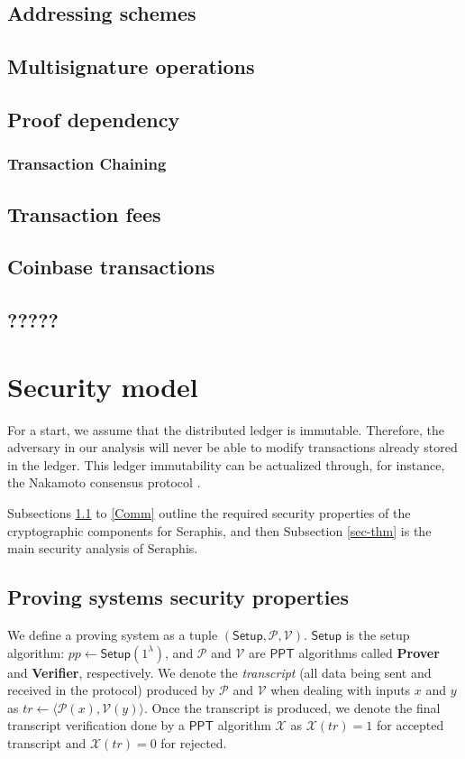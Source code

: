 \documentclass{article}
\theoremstyle{plain}
\theoremstyle{remark}
\begin{document}
\subsection{Addressing schemes}\label{addr-scheme}
\subsection{Multisignature operations}
\subsection{Proof dependency}\label{proof-dep}
\subsubsection*{Transaction Chaining}
\subsection{Transaction fees}
\subsection{Coinbase transactions}
\subsection{?????}

\section{Security model}\label{sec}
For a start, we assume that the distributed ledger is immutable. Therefore, the adversary in our analysis will never be able to modify transactions already stored in the ledger. This ledger immutability can be actualized through, for instance, the Nakamoto consensus protocol \cite{bitcoin}.

Subsections \ref{prov-prop} to \ref{Comm} outline the required security properties of the cryptographic components for Seraphis, and then Subsection \ref{sec-thm} is the main security analysis of Seraphis. %

\subsection{Proving systems security properties}\label{prov-prop}
We define a proving system as a tuple $(\textsf{Setup}, \mathcal{P}, \mathcal{V})$. $\textsf{Setup}$ is the setup algorithm: $pp\leftarrow\textsf{Setup}(1^{\lambda})$, and $\mathcal{P}$ and $\mathcal{V}$ are $\textsf{PPT}$ algorithms called \textbf{Prover} and \textbf{Verifier}, respectively. We denote the \textit{transcript} (all data being sent and received in the protocol) produced by $\mathcal{P}$ and $\mathcal{V}$ when dealing with inputs $x$ and $y$ as $tr\leftarrow\langle\mathcal{P}(x), \mathcal{V}(y)\rangle$. Once the transcript is produced, we denote the final transcript verification done by a $\textsf{PPT}$ algorithm $\mathcal{X}$ as $\mathcal{X}(tr)=1$ for accepted transcript and $\mathcal{X}(tr)=0$ for rejected. 
\end{document}
